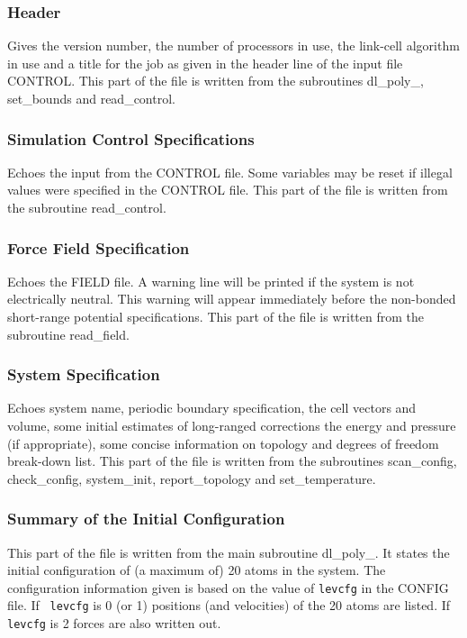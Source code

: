 \subsubsection{Header}

Gives the \D version number, the number of processors in use, the
link-cell algorithm in use and a title for the job as given in the
header line of the input file CONTROL.  This part of the file is
written from the subroutines {\sc dl\_poly\_}, {\sc set\_bounds}
and {\sc read\_control}.

\subsubsection{Simulation Control Specifications}

Echoes the input from the CONTROL file.  Some variables may be
reset if illegal values were specified in the CONTROL file.  This
part of the file is written from the subroutine {\sc
read\_control}.

\subsubsection{Force Field Specification}

Echoes the FIELD file.  A warning line will be printed if the
system is not electrically neutral.  This warning will appear
immediately before the non-bonded short-range potential
specifications.  This part of the file is written from the
subroutine {\sc read\_field}.

\subsubsection{System Specification}

Echoes system name, periodic boundary specification, the cell
vectors and volume, some initial estimates of long-ranged
corrections the energy and pressure (if appropriate), some
concise information on topology and degrees of freedom
break-down list.  This part of the file is written from the
subroutines {\sc scan\_config}, {\sc check\_config},
{\sc system\_init}, {\sc report\_topology} and
{\sc set\_temperature}.

\subsubsection{Summary of the Initial Configuration}

This part of the file is written from the main subroutine {\sc
dl\_poly\_}.  It states the initial configuration of (a maximum
of) 20 atoms in the system.  The configuration information given
is based on the value of {\tt levcfg} in the CONFIG file.  If {\tt
levcfg} is 0 (or 1) positions (and velocities) of the 20 atoms are
listed.  If {\tt levcfg} is 2 forces are also written out.


